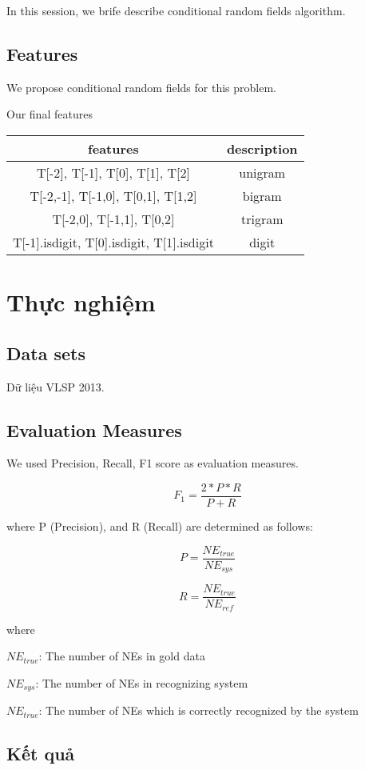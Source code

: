 \documentclass[11pt,a4paper]{article}
\begin{document}
In this session, we brife describe conditional random fields algorithm.

\subsection{Features}
We propose conditional random fields for this problem.

Our final features
\begin{center}
\begin{tabular}{ |c|c| }
 \hline
 features & description \\
 \hline
 T[-2], T[-1], T[0], T[1], T[2] & unigram  \\
 T[-2,-1], T[-1,0], T[0,1], T[1,2] & bigram  \\
 T[-2,0], T[-1,1], T[0,2] & trigram \\
 T[-1].isdigit, T[0].isdigit, T[1].isdigit & digit
 \hline
\end{tabular}
\end{center}

\section{Thực nghiệm}

\subsection{Data sets}

Dữ liệu VLSP 2013.

\subsection{Evaluation Measures}

We used Precision, Recall, F1 score as evaluation measures.

$$F_1 = \frac{2*P*R}{P + R}$$

where P (Precision), and R (Recall) are determined as follows:

$$P = \frac{{NE}_{true}}{NE_{sys}}$$

$$R = \frac{{NE}_{true}}{NE_{ref}}$$

where

$NE_{true}$: The number of NEs in gold data

$NE_{sys}$: The number of NEs in recognizing system

$NE_{true}$: The number of NEs which is correctly recognized by the system

\subsection{Kết quả}
\end{document}
